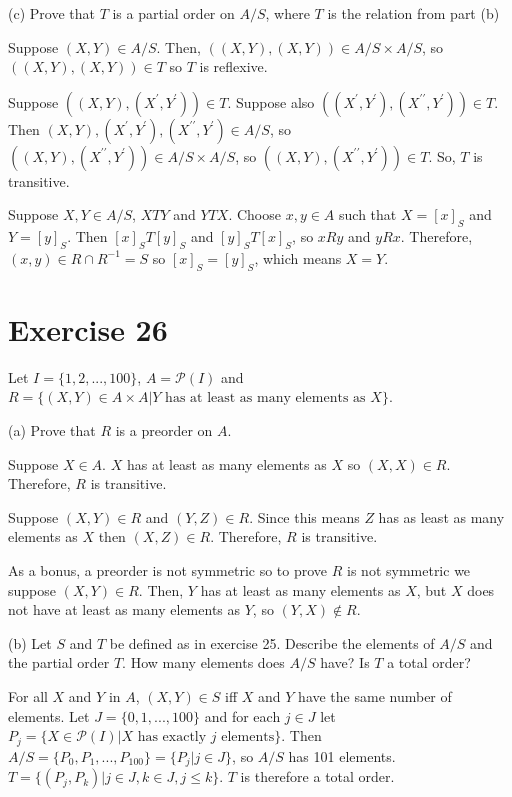 \documentclass[11pt]{article}
\newcommand{\powerset}[1]{\mathscr{P}(#1)}
\newcommand{\dprime}{{\prime \prime}}
\begin{document}
\noindent (c) Prove that $T$ is a partial order on $A/S$, where $T$ is the relation 
from part (b)

Suppose $(X,Y) \in A/S$. Then, $((X, Y), (X,Y)) \in A/S \times A/S$,
so $((X, Y), (X,Y)) \in T$ so $T$ is reflexive.

Suppose $((X, Y), (X^\prime, Y^\prime)) \in T$. Suppose also 
$((X^\prime, Y^\prime), (X^\dprime, Y^\prime)) \in T$. Then 
$(X, Y), (X^\prime, Y^\prime), (X^\dprime, Y^\prime) \in A/S$, so 
$((X, Y), (X^\dprime, Y^\prime)) \in A/S \times A/S$, so 
$((X, Y), (X^\dprime, Y^\prime)) \in T$. So, $T$ is transitive.

Suppose $X, Y \in A/S$, $XTY$ and $YTX$. Choose $x,y \in A$ such that $X = [x]_S$
and $Y = [y]_S$. Then $[x]_S T [y]_S$ and $[y]_S T [x]_S$, so $xRy$ and $yRx$.
Therefore, $(x,y) \in R \cap R^{-1} = S$ so $[x]_S = [y]_S$, which means 
$X=Y$.

\section*{Exercise 26}

Let $I = \{1,2,...,100\}$, $A = \powerset{I}$ and 
$R = \{(X,Y) \in A \times A | Y \text{ has at least as many elements as } X\}$.

\noindent (a) Prove that $R$ is a preorder on $A$.

Suppose $X \in A$. $X$ has at least as many elements as $X$ so $(X,X) \in R$.
Therefore, $R$ is transitive.

Suppose $(X, Y) \in R$ and $(Y, Z) \in R$. Since this means $Z$ has as least as 
many elements as $X$ then $(X, Z) \in R$. Therefore, $R$ is transitive.

As a bonus, a preorder is not symmetric so to prove $R$ is not symmetric we suppose 
$(X, Y) \in R$. Then, $Y$ has at least as many elements as $X$, but $X$ does not 
have at least as many elements as $Y$, so $(Y, X) \notin R$.

\noindent (b) Let $S$ and $T$ be defined as in exercise 25. Describe the elements 
of $A/S$ and the partial order $T$. How many elements does $A/S$ have? Is $T$ a 
total order?

For all $X$ and $Y$ in $A$, $(X, Y) \in S$ iff $X$ and $Y$ have the same number
of elements. Let $J = \{0, 1,...,100\}$ and for each $j \in J$ let 
$P_j = \{X \in \powerset{I} | X \text{ has exactly } j \text{ elements}\}$. 
Then $A/S = \{P_0, P_1,...,P_100\} = \{P_j | j \in J\}$, so $A/S$ has 101 elements.
$T = \{(P_j, P_k) | j \in J, k \in J, j \leq k\}$. $T$ is therefore a total order.
\end{document}
